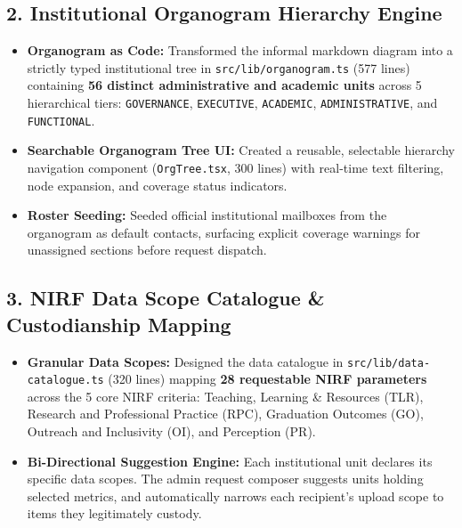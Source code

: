\documentclass[11pt,a4paper]{article}
\begin{document}
\subsection{2. Institutional Organogram Hierarchy Engine}
\begin{itemize}[leftmargin=1.4em, itemsep=2pt]
\item \textbf{Organogram as Code:} Transformed the informal markdown diagram into a strictly typed institutional tree in \texttt{src/lib/organogram.ts} (577 lines) containing \textbf{56 distinct administrative and academic units} across 5 hierarchical tiers: \texttt{GOVERNANCE}, \texttt{EXECUTIVE}, \texttt{ACADEMIC}, \texttt{ADMINISTRATIVE}, and \texttt{FUNCTIONAL}.
\item \textbf{Searchable Organogram Tree UI:} Created a reusable, selectable hierarchy navigation component (\texttt{OrgTree.tsx}, 300 lines) with real-time text filtering, node expansion, and coverage status indicators.
\item \textbf{Roster Seeding:} Seeded official institutional mailboxes from the organogram as default contacts, surfacing explicit coverage warnings for unassigned sections before request dispatch.
\end{itemize}

\subsection{3. NIRF Data Scope Catalogue \& Custodianship Mapping}
\begin{itemize}[leftmargin=1.4em, itemsep=2pt]
\item \textbf{Granular Data Scopes:} Designed the data catalogue in \texttt{src/lib/data-catalogue.ts} (320 lines) mapping \textbf{28 requestable NIRF parameters} across the 5 core NIRF criteria: Teaching, Learning \& Resources (TLR), Research and Professional Practice (RPC), Graduation Outcomes (GO), Outreach and Inclusivity (OI), and Perception (PR).
\item \textbf{Bi-Directional Suggestion Engine:} Each institutional unit declares its specific data scopes. The admin request composer suggests units holding selected metrics, and automatically narrows each recipient's upload scope to items they legitimately custody.
\end{itemize}
\end{document}
